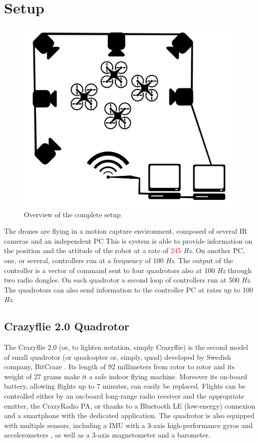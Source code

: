 \documentclass[a4paper, 12pt]{report}
\begin{document}
\section{Setup}
\begin{figure}[htbp]
\centering
\includegraphics[width=.7\textwidth]{Images/setup}
\caption{Overview of the complete setup}
\label{fig:setup}
\end{figure}
The drones are flying in a motion capture environment, composed of several IR cameras and an independent PC This is system is able to provide information on the position and the attitude of the robot at a rate of \textcolor{red}{245} \emph{Hz}. On another PC, one, or several, controllers run at a frequency of 100 \emph{Hz}. The output of the controller is a vector of command sent to four quadrotors also at 100 \emph{Hz} through two radio dongles. On each quadrotor a second loop of controllers run at  500 \emph{Hz}. The quadrotors can also send information to the controller PC at rates up to 100 \emph{Hz}.

\subsection{Crazyflie 2.0 Quadrotor}
The Crazyflie 2.0 (or, to lighten notation, simply Crazyflie) is the second model of small quadrotor (or quadcopter or, simply, quad) developed by Swedish company, BitCraze \cite{bitcraze}. Its length of 92 millimeters from rotor to rotor and its weight of 27 grams make it a safe indoor flying machine. Moreover its on-board battery, allowing flights up to 7 minutes, can easily be replaced. Flights can be controlled either by an on-board long-range radio receiver and the appropriate emitter, the CrazyRadio PA, or thanks to a Bluetooth LE (low-energy) connexion and a smartphone with the dedicated application. The quadrotor is also equipped with multiple sensors, including a IMU with a 3-axis high-performance gyros and accelerometers , as well as a 3-axis magnetometer and a barometer.
\end{document}

